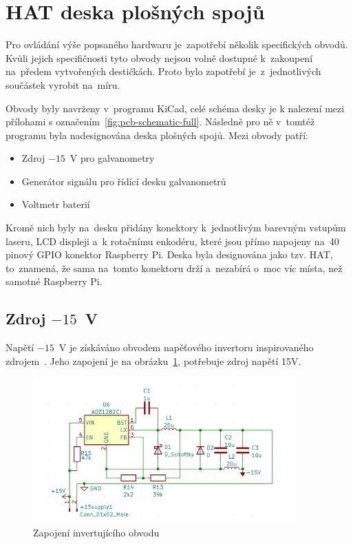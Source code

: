 \section{HAT deska plošných spojů}
Pro ovládání výše popsaného hardwaru je~zapotřebí několik specifických obvodů.
Kvůli jejich specifičnosti tyto obvody nejsou volně dostupné k~zakoupení na~předem vytvořených destičkách. Proto bylo zapotřebí je~z~jednotlivých součástek vyrobit na~míru.

Obvody byly navrženy v~programu KiCad, celé schéma desky je k nalezení mezi přílohami s označením~\ref{fig:pcb-schematic-full}. Následně pro ně v~tomtéž programu byla nadesignována deska plošných spojů. Mezi obvody patří:
\begin{itemize}
  \item Zdroj $-15$~V pro galvanometry
  \item Generátor signálu pro řídící desku galvanometrů
  \item Voltmetr baterií
\end{itemize}

Kromě nich byly na~desku přidány konektory k~jednotlivým barevným vstupům laseru, LCD displeji a~k rotačnímu enkodéru, které jsou přímo napojeny na~40 pinový GPIO konektor Raspberry Pi.
Deska byla designována jako tzv. HAT, to~znamená, že sama na~tomto konektoru drží a~nezabírá o~moc víc místa, než samotné Raspberry Pi.

\subsection{Zdroj $-15$~V~\cite{ampalyzer}}\label{sec:negative-ps}
Napětí $-15$~V je získáváno obvodem napěťového invertoru inspirovaného zdrojem~\cite{ampalyzer}. Jeho zapojení je na obrázku~\ref{fig:negative-ps}, potřebuje zdroj napětí 15V.

\begin{figure}[htb]
  \centering
  \includegraphics[width=0.9\textwidth]{img/negative-ps.jpg}
  \caption{\label{fig:negative-ps} Zapojení invertujícího obvodu}
\end{figure}

